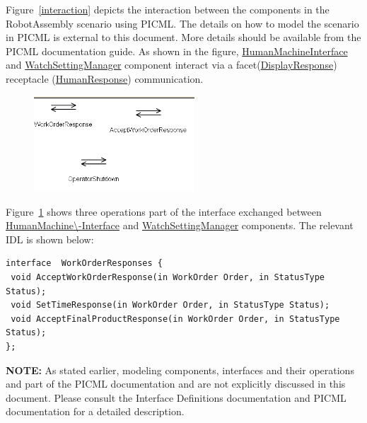 \documentclass[onecolumn]{article}
\begin{document}
Figure~\ref{interaction} depicts the interaction between the
components in the RobotAssembly scenario using PICML. The details on
how to model the scenario in PICML is external to this document. More
details should be available from the PICML documentation guide. As
shown in the figure, \url{HumanMachineInterface} and
\url{WatchSettingManager} component interact via a
facet(\url{DisplayResponse}) receptacle (\url{HumanResponse})
communication.

\begin{figure}[ht]
{
  \includegraphics[width=6cm]{RobotAssembly-Operations.png}
    \label{operations}
}
\end{figure}
Figure~\ref{operations} shows three operations part of the interface
exchanged between \url{HumanMachine\-Interface} and
\url{WatchSettingManager} components. The relevant IDL is shown below:
{
\small
{}
\begin{verbatim}
interface  WorkOrderResponses {
 void AcceptWorkOrderResponse(in WorkOrder Order, in StatusType Status);
 void SetTimeResponse(in WorkOrder Order, in StatusType Status);
 void AcceptFinalProductResponse(in WorkOrder Order, in StatusType Status);
};
\end{verbatim}
}
\normalsize

{\bf NOTE:} As stated earlier, modeling components, interfaces and their
operations and part of the PICML documentation and are not explicitly
discussed in this document. Please consult the Interface Definitions
documentation and PICML documentation for a detailed description.
\end{document}
